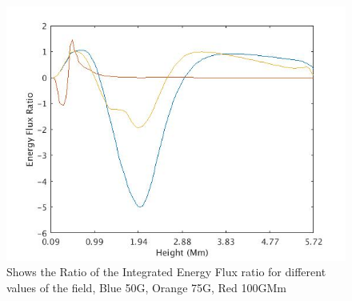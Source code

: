 \documentclass{aastex62}
\begin{document}
\begin{figure}[h]\label{energyfluxratio_50G_75G_100G_line}
\includegraphics[scale=0.45]{imrescale/energyfluxratio.jpg}
\caption{Shows the Ratio of the Integrated Energy Flux ratio for different values of the field, Blue 50G, Orange 75G, Red 100GMm}
\end{figure}









\end{document}
